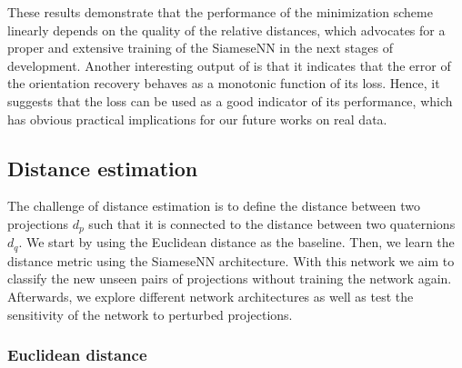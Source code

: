 These results demonstrate that the performance of the minimization scheme~ linearly depends on the quality of the relative distances, which advocates for a proper and extensive training of the SiameseNN in the next stages of development.
Another interesting output of  is that it indicates that the error of the orientation recovery behaves as a monotonic function of its loss.
Hence, it suggests that the loss can be used as a good indicator of its performance, which has obvious practical implications for our future works on real data.


\subsection{Distance estimation}\label{sec:results:distance-estimation}


The challenge of distance estimation is to define the distance between two projections $d_p$ such that it is connected to the distance between two quaternions $d_q$. We start by using the Euclidean distance as the baseline. Then, we learn the distance metric using the SiameseNN architecture. With this network we aim to classify the new unseen pairs of projections without training the network again. Afterwards, we explore different network architectures as well as test the sensitivity of the network to perturbed projections. 



\subsubsection{Euclidean distance}\label{sec:results:distance-estimation:euclidean}


